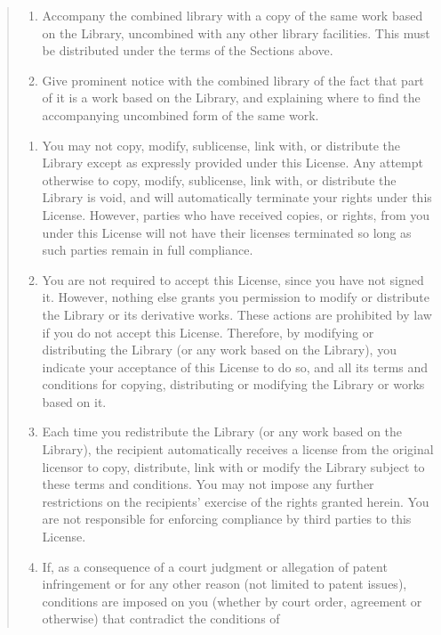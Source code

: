\documentclass[
]{book}
\theoremstyle{definition}
\theoremstyle{definition}
\theoremstyle{definition}
\theoremstyle{definition}
\theoremstyle{remark}
\begin{document}
\begin{quote}
\begin{enumerate}
\def\labelenumi{\alph{enumi})}
\item
  Accompany the combined library with a copy of the same work
  based on the Library, uncombined with any other library
  facilities. This must be distributed under the terms of the
  Sections above.
\item
  Give prominent notice with the combined library of the fact
  that part of it is a work based on the Library, and explaining
  where to find the accompanying uncombined form of the same work.
\end{enumerate}

\begin{enumerate}
\def\labelenumi{\arabic{enumi}.}
\setcounter{enumi}{7}
\item
  You may not copy, modify, sublicense, link with, or
  distribute the Library except as expressly provided under this
  License. Any attempt otherwise to copy, modify, sublicense,
  link with, or distribute the Library is void, and will
  automatically terminate your rights under this License.
  However, parties who have received copies, or rights, from you
  under this License will not have their licenses terminated so
  long as such parties remain in full compliance.
\item
  You are not required to accept this License, since you have
  not signed it. However, nothing else grants you permission to
  modify or distribute the Library or its derivative works. These
  actions are prohibited by law if you do not accept this
  License. Therefore, by modifying or distributing the Library
  (or any work based on the Library), you indicate your acceptance
  of this License to do so, and all its terms and conditions for
  copying, distributing or modifying the Library or works based on
  it.
\item
  Each time you redistribute the Library (or any work based on
  the Library), the recipient automatically receives a license
  from the original licensor to copy, distribute, link with or
  modify the Library subject to these terms and conditions. You
  may not impose any further restrictions on the recipients'
  exercise of the rights granted herein. You are not responsible
  for enforcing compliance by third parties to this License.
\item
  If, as a consequence of a court judgment or allegation of
  patent infringement or for any other reason (not limited to
  patent issues), conditions are imposed on you (whether by court
  order, agreement or otherwise) that contradict the conditions of

\end{enumerate}
\end{quote}
\end{document}
